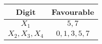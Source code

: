 
\begin{center}
    \begin{tabular}{|c|c|}
    \hline
	    \textbf{Digit}& \textbf{Favourable} \\ \hline
	    $X_{1}$ 		   & 	$5,7$	\\ \hline
	    $X_{2},X_{3},X_{4}$ 		   & 	$0,1,3,5,7$ \\ \hline

    \end{tabular}
    \end{center}

